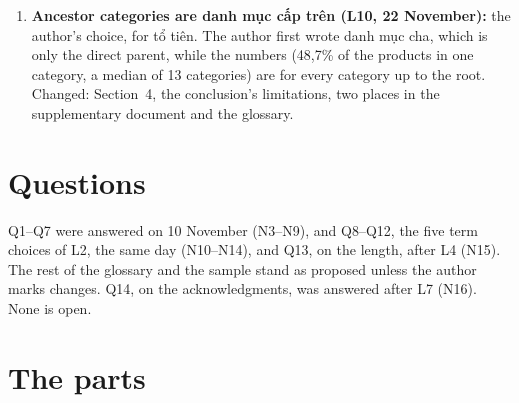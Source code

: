 \documentclass[11pt,a4paper]{article}
\DeclareRobustCommand{\code}[1]{\texttt{\detokenize{#1}}}
\newcommand{\vi}[1]{\foreignlanguage{vietnamese}{#1}}
\begin{document}
\begin{enumerate}[label=N\arabic*]
        \code{latexmkrc} does this with Overleaf's rule for \code{xr}. Column balancing stays off,
        since acmart's \verb|\balance| would come in the second column of the last page and warn.
  \item \textbf{Ancestor categories are \vi{danh mục cấp trên} (L10, 22 November):} the author's
        choice, for \vi{tổ tiên}. The author first wrote \vi{danh mục cha}, which is only the direct
        parent, while the numbers (48,7\% of the products in one category, a median of 13
        categories) are for every category up to the root. Changed: Section~4, the conclusion's
        limitations, two places in the supplementary document and the glossary.
\end{enumerate}

\section{Questions}\label{sec:questions}

Q1--Q7 were answered on 10 November (N3--N9), and Q8--Q12, the five term choices of L2, the same
day (N10--N14), and Q13, on the length, after L4 (N15). The rest of the glossary and the sample
stand as proposed unless the author marks changes. Q14, on the acknowledgments, was answered
after L7 (N16). None is open.

\section{The parts}\label{sec:parts}
\end{document}
